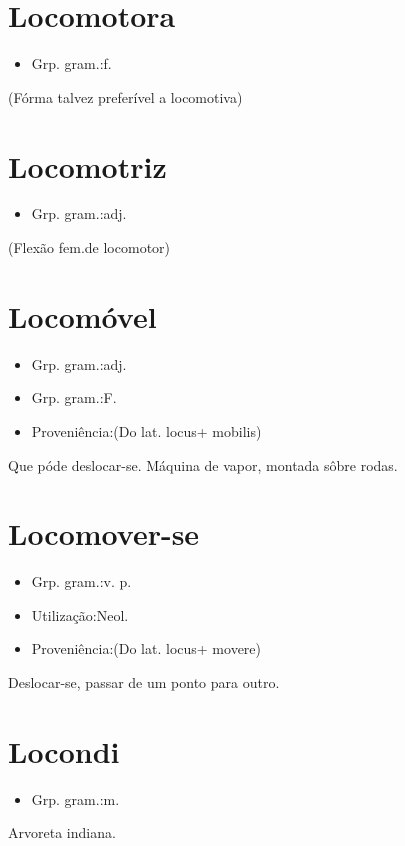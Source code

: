 \section{Locomotora}
\begin{itemize}
\item {Grp. gram.:f.}
\end{itemize}
(Fórma talvez preferível a \textunderscore locomotiva\textunderscore )
\section{Locomotriz}
\begin{itemize}
\item {Grp. gram.:adj.}
\end{itemize}
(Flexão \textunderscore fem.\textunderscore  de \textunderscore locomotor\textunderscore )
\section{Locomóvel}
\begin{itemize}
\item {Grp. gram.:adj.}
\end{itemize}
\begin{itemize}
\item {Grp. gram.:F.}
\end{itemize}
\begin{itemize}
\item {Proveniência:(Do lat. \textunderscore locus\textunderscore  + \textunderscore mobilis\textunderscore )}
\end{itemize}
Que póde deslocar-se.
Máquina de vapor, montada sôbre rodas.
\section{Locomover-se}
\begin{itemize}
\item {Grp. gram.:v. p.}
\end{itemize}
\begin{itemize}
\item {Utilização:Neol.}
\end{itemize}
\begin{itemize}
\item {Proveniência:(Do lat. \textunderscore locus\textunderscore  + \textunderscore movere\textunderscore )}
\end{itemize}
Deslocar-se, passar de um ponto para outro.
\section{Locondi}
\begin{itemize}
\item {Grp. gram.:m.}
\end{itemize}
Arvoreta indiana.
